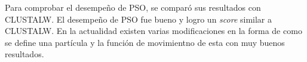 \documentclass[conference]{IEEEtran}
\begin{document}
Para comprobar el desempeño de PSO, se comparó sus resultados con CLUSTALW. El desempeño de PSO fue bueno y logro un \textit{score} similar a CLUSTALW. En la actualidad existen varias modificaciones en la forma de como se define una partícula y la función de movimientno de esta con muy buenos resultados. \\





 

\end{document}

